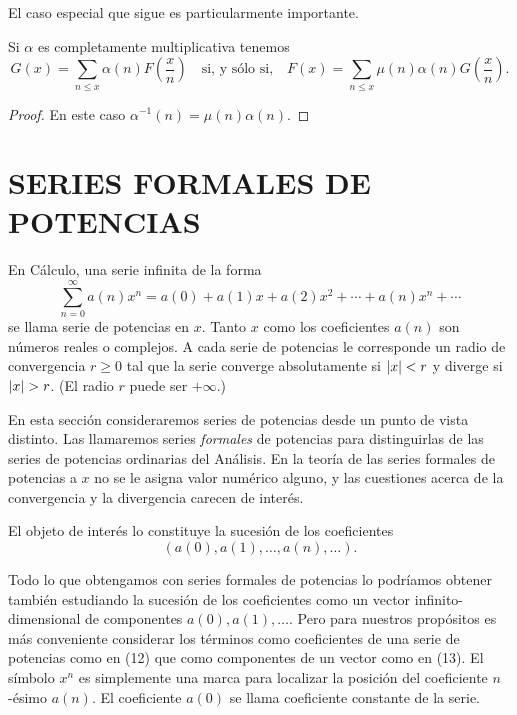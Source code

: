 \documentclass[12pt,a4paper]{book}
\begin{document}
    El caso especial que sigue es particularmente importante.

    \begin{teorema}
        Si $\alpha$ es completamente multiplicativa tenemos
        \begin{equation*}
            G(x)=\sum_{n\leq x}\alpha(n)F\left(\frac{x}{n}\right)\quad\text{si, y sólo si,}
            \quad F(x)=\sum_{n\leq x}\mu(n)\alpha(n)G\left(\frac{x}{n}\right).
        \end{equation*}
    \end{teorema}

    \begin{proof}
        En este caso $\alpha^{-1}(n)=\mu(n)\alpha(n)$.
    \end{proof}

    \section{SERIES FORMALES DE POTENCIAS}

    En Cálculo, una serie infinita de la forma
    \begin{equation}
        \sum_{n=0}^{\infty}a(n)x^n=a(0)+a(1)x+a(2)x^2+\cdots+a(n)x^n+\cdots
    \end{equation}
    se llama serie de potencias en $x$. Tanto $x$ como los coeficientes $a(n)$ son números
    reales o complejos. A cada serie de potencias le corresponde un radio de convergencia
    $r\geq0$ tal que la serie converge absolutamente si $\abs{x}<r$ y diverge si
    $\abs{x}>r$. (El radio $r$ puede ser $+\infty$.)

    En esta sección consideraremos series de potencias desde un punto de vista distinto.
    Las llamaremos series \textit{formales} de potencias para distinguirlas de las series
    de potencias ordinarias del Análisis. En la teoría de las series formales de potencias
    a $x$ no se le asigna valor numérico alguno, y las cuestiones acerca de la convergencia
    y la divergencia carecen de interés.

    El objeto de interés lo constituye la sucesión de los coeficientes
    \begin{equation}
        (a(0),a(1),\dots,a(n),\dots).
    \end{equation}

    Todo lo que obtengamos con series formales de potencias lo podríamos obtener también
    estudiando la sucesión de los coeficientes como un vector infinito-dimensional de
    componentes $a(0),a(1),\dots$. Pero para nuestros propósitos es más conveniente
    considerar los términos como coeficientes de una serie de potencias como en (12) que
    como componentes de un vector como en (13). El símbolo $x^n$ es simplemente una marca
    para localizar la posición del coeficiente $n$-ésimo $a(n)$. El coeficiente $a(0)$ se
    llama coeficiente constante de la serie.
\end{document}
